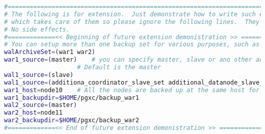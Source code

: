 \begin{lstlisting}[language=bash,caption={Konfigurationsdatei pgxc-ctl}]
#========================================================================================================================
# The following is for extension.  Just demonstrate how to write such extension.  There's no code
# which takes care of them so please ignore the following lines.  They are simply ignored by pgxc_ctl.
# No side effects.
#=============<< Beginning of future extension demonistration >> ========================================================
# You can setup more than one backup set for various purposes, such as disaster recovery.
walArchiveSet=(war1 war2)
war1_source=(master)	# you can specify master, slave or ano other additional slaves as a source of WAL archive.
					# Default is the master
wal1_source=(slave)
wal1_source=(additiona_coordinator_slave_set additional_datanode_slave_set)
war1_host=node10	# All the nodes are backed up at the same host for a given archive set
war1_backupdir=$HOME/pgxc/backup_war1
wal2_source=(master)
war2_host=node11
war2_backupdir=$HOME/pgxc/backup_war2
#=============<< End of future extension demonistration >> ========================================================


\end{lstlisting} 
 
